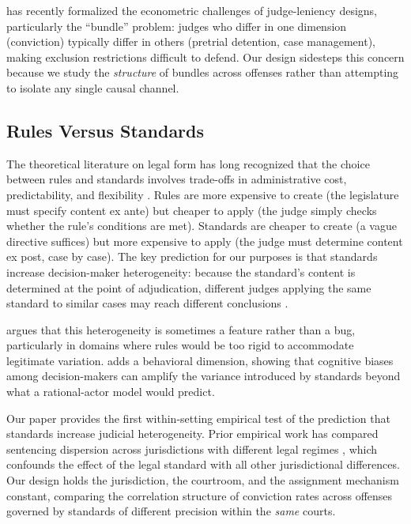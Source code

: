 \documentclass[12pt]{article}
\begin{document}
\citet{hull2025} has recently formalized the econometric challenges of judge-leniency designs, particularly the ``bundle'' problem: judges who differ in one dimension (conviction) typically differ in others (pretrial detention, case management), making exclusion restrictions difficult to defend. Our design sidesteps this concern because we study the \textit{structure} of bundles across offenses rather than attempting to isolate any single causal channel.

\subsection{Rules Versus Standards}

The theoretical literature on legal form has long recognized that the choice between rules and standards involves trade-offs in administrative cost, predictability, and flexibility \citep{ehrlich1974, kaplow1992}. Rules are more expensive to create (the legislature must specify content ex ante) but cheaper to apply (the judge simply checks whether the rule's conditions are met). Standards are cheaper to create (a vague directive suffices) but more expensive to apply (the judge must determine content ex post, case by case). The key prediction for our purposes is that standards increase decision-maker heterogeneity: because the standard's content is determined at the point of adjudication, different judges applying the same standard to similar cases may reach different conclusions \citep{kaplow1992}.

\citet{sunstein1995} argues that this heterogeneity is sometimes a feature rather than a bug, particularly in domains where rules would be too rigid to accommodate legitimate variation. \citet{korobkin2000} adds a behavioral dimension, showing that cognitive biases among decision-makers can amplify the variance introduced by standards beyond what a rational-actor model would predict.

Our paper provides the first within-setting empirical test of the prediction that standards increase judicial heterogeneity. Prior empirical work has compared sentencing dispersion across jurisdictions with different legal regimes \citep{abrams2012}, which confounds the effect of the legal standard with all other jurisdictional differences. Our design holds the jurisdiction, the courtroom, and the assignment mechanism constant, comparing the correlation structure of conviction rates across offenses governed by standards of different precision within the \textit{same} courts.
\end{document}
